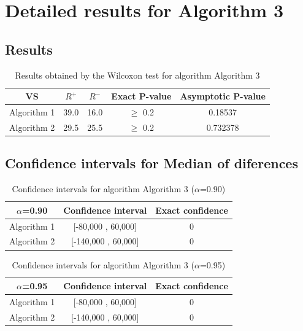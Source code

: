 \documentclass[a4paper,10pt]{article}
\begin{document}
 \clearpage 


\section{Detailed results for Algorithm 3}


\subsection{Results}

\begin{table}[!htp]
\centering\small
\begin{tabular}{
|c|c|c|c|c|}
\hline
 VS & $R^{+}$ & $R^{-}$ & Exact P-value & Asymptotic P-value \\ \hline 
Algorithm 1 & 39.0 & 16.0 & $\geq$ 0.2 & 0.18537\\ \hline 
Algorithm 2 & 29.5 & 25.5 & $\geq$ 0.2 & 0.732378\\ \hline 

\end{tabular}
\caption{Results obtained by the Wilcoxon test for algorithm Algorithm 3}
\end{table}

\subsection{Confidence intervals for Median of diferences}

\begin{table}[!htp]
\centering\small
\begin{tabular}{
|c|c|c|}
\hline
 $\alpha$=0.90 & Confidence interval & Exact confidence \\ \hline 
Algorithm 1 & [-80,000 , 60,000] & 0\\ \hline 
Algorithm 2 & [-140,000 , 60,000] & 0\\ \hline 

\end{tabular}
\caption{Confidence intervals for algorithm Algorithm 3 ($\alpha$=0.90)}
\end{table}
\begin{table}[!htp]
\centering\small
\begin{tabular}{
|c|c|c|}
\hline
 $\alpha$=0.95 & Confidence interval & Exact confidence \\ \hline 
Algorithm 1 & [-80,000 , 60,000] & 0\\ \hline 
Algorithm 2 & [-140,000 , 60,000] & 0\\ \hline 

\end{tabular}
\caption{Confidence intervals for algorithm Algorithm 3 ($\alpha$=0.95)}
\end{table}

 \clearpage 
\end{document}
